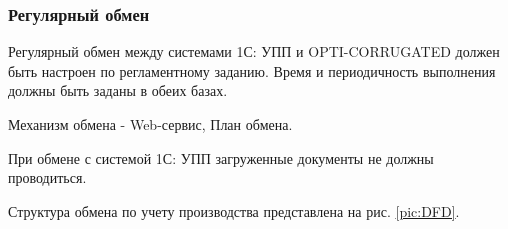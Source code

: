 


\subsubsection{Регулярный обмен}
\label{exchange:regular}
Регулярный обмен между системами 1С: УПП и OPTI-CORRUGATED должен быть настроен по регламентному заданию. Время и периодичность выполнения должны быть заданы в обеих базах.

Механизм обмена - Web-сервис, План обмена.

При обмене с системой 1С: УПП загруженные документы не должны проводиться.

Структура обмена по учету производства представлена на рис. \ref{pic:DFD}.

